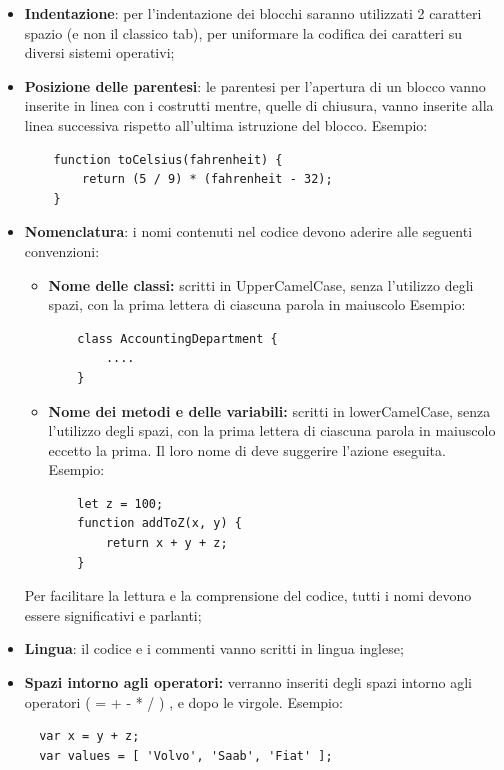 \begin{itemize}
  \item \textbf{Indentazione}: per l'indentazione dei blocchi saranno utilizzati 2 caratteri spazio (e non il classico tab), per uniformare la codifica dei caratteri su diversi sistemi operativi;
  \item \textbf{Posizione delle parentesi}: le parentesi per l'apertura di un blocco vanno inserite in linea con i costrutti mentre, quelle di chiusura, vanno inserite alla linea successiva rispetto all'ultima istruzione del blocco.
  Esempio:
  \begin{lstlisting}
  	function toCelsius(fahrenheit) {
  		return (5 / 9) * (fahrenheit - 32);
  	}
  \end{lstlisting}
  \item \textbf{Nomenclatura}: i nomi contenuti nel codice devono aderire alle seguenti convenzioni:
  \begin{itemize}
  	\item \textbf{Nome delle classi:} scritti in UpperCamelCase, senza l'utilizzo degli spazi, con la prima lettera di ciascuna parola in maiuscolo Esempio:
  	\begin{lstlisting}
  	class AccountingDepartment {
  		....
  	}
  	\end{lstlisting}
  	\item \textbf{Nome dei metodi e delle variabili:} scritti in lowerCamelCase, senza l'utilizzo degli spazi, con la prima lettera di ciascuna parola in maiuscolo eccetto la prima. Il loro nome di deve suggerire l'azione eseguita. Esempio:
  	\begin{lstlisting}
  	let z = 100;
  	function addToZ(x, y) {
  		return x + y + z;
  	}
  	\end{lstlisting}
  \end{itemize}
  Per facilitare la lettura e la comprensione del codice, tutti i nomi devono essere significativi e parlanti;
  \item \textbf{Lingua}: il codice e i commenti vanno scritti in lingua inglese;
  \item \textbf{Spazi intorno agli operatori:} verranno inseriti degli spazi intorno agli operatori ( = + - * / ) , e dopo le virgole.
  Esempio:
  \begin{lstlisting}
  var x = y + z;
  var values = [ 'Volvo', 'Saab', 'Fiat' ];
  \end{lstlisting}

\end{itemize}

